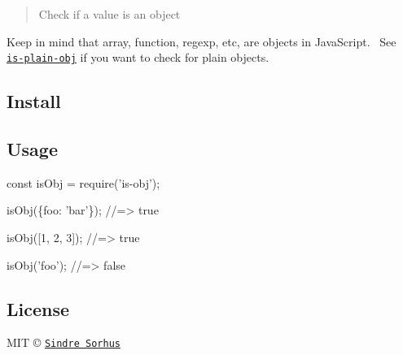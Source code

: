 \begin{quote}
Check if a value is an object \end{quote}


Keep in mind that array, function, regexp, etc, are objects in Java\+Script.~\newline
 See \href{https://github.com/sindresorhus/is-plain-obj}{\tt {\ttfamily is-\/plain-\/obj}} if you want to check for plain objects.

\subsection*{Install}




\subsection*{Usage}


\begin{DoxyCode}
const isObj = require('is-obj');

isObj(\{foo: 'bar'\});
//=> true

isObj([1, 2, 3]);
//=> true

isObj('foo');
//=> false
\end{DoxyCode}


\subsection*{License}

M\+IT © \href{https://sindresorhus.com}{\tt Sindre Sorhus} 